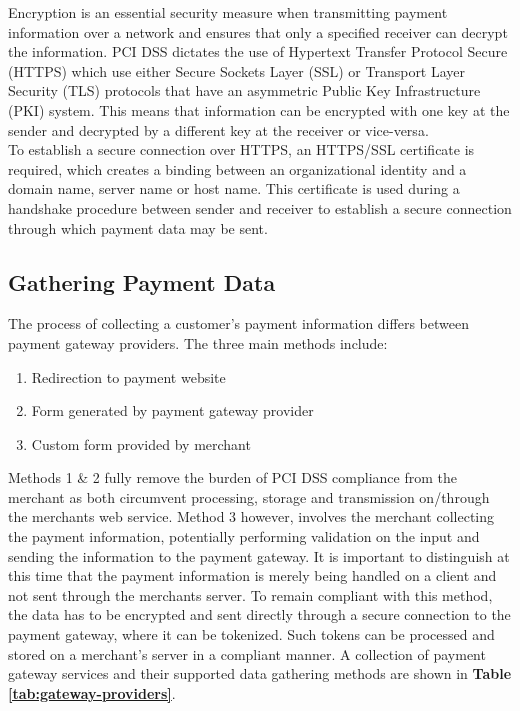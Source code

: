 Encryption is an essential security measure when transmitting payment information over a network and ensures that only a specified receiver can decrypt the information. PCI DSS dictates the use of Hypertext Transfer Protocol Secure (HTTPS) which use either Secure Sockets Layer (SSL) or Transport Layer Security (TLS) protocols that have an asymmetric Public Key Infrastructure (PKI) system. This means that information can be encrypted with one key at the sender and decrypted by a different key at the receiver or vice-versa\cite{comodo}.\\

To establish a secure connection over HTTPS, an HTTPS/SSL certificate is required, which creates a binding between an organizational identity and a domain name, server name or host name\cite{ssl-certificate}. This certificate is used during a handshake procedure between sender and receiver to establish a secure connection through which payment data may be sent.

\subsection{Gathering Payment Data}
\label{subsec:gathering-payment-data}

The process of collecting a customer's payment information differs between payment gateway providers. The three main methods include:

\begin{enumerate}
	\item Redirection to payment website
    \item Form generated by payment gateway provider
    \item Custom form provided by merchant
\end{enumerate}

Methods 1 \& 2 fully remove the burden of PCI DSS compliance from the merchant as both circumvent processing, storage and transmission on/through the merchants web service. Method 3 however, involves the merchant collecting the payment information, potentially performing validation on the input and sending the information to the payment gateway. It is important to distinguish at this time that the payment information is merely being handled on a client and not sent through the merchants server. To remain compliant with this method, the data has to be encrypted and sent directly through a secure connection to the payment gateway, where it can be tokenized. Such tokens can be processed and stored on a merchant's server in a compliant manner. A collection of payment gateway services and their supported data gathering methods are shown in \textbf{Table \ref{tab:gateway-providers}}. \\

